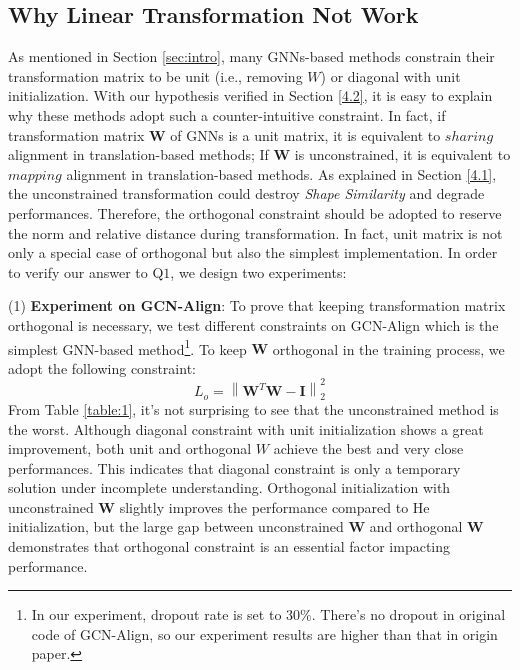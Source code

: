 \documentclass[sigconf,camera-ready]{acmart}
\begin{document}
\subsection{Why Linear Transformation Not Work}
\label{4.3}
As mentioned in Section \ref{sec:intro}, many GNNs-based methods \cite{DBLP:conf/acl/CaoLLLLC19,yang2019aligning,li-etal-2019-semi,DBLP:conf/wsdm/MaoWXLW20} constrain their transformation matrix to be unit (i.e., removing $W$) or diagonal with unit initialization.
With our hypothesis verified in Section \ref{4.2}, it is easy to explain why these methods adopt such a counter-intuitive constraint.
In fact, if transformation matrix $\bm{W}$ of GNNs is a unit matrix, it is equivalent to $sharing$ alignment in translation-based methods;
If $\bm{W}$ is unconstrained, it is equivalent to $mapping$ alignment in translation-based methods.
As explained in Section \ref{4.1}, the unconstrained transformation could destroy \emph{Shape Similarity} and degrade performances.
Therefore, the orthogonal constraint should be adopted to reserve the norm and relative distance during transformation.
In fact, unit matrix is not only a special case of orthogonal but also the simplest implementation.
In order to verify our answer to Q$1$, we design two experiments:

\noindent
(1) \textbf{Experiment on GCN-Align}:
To prove that keeping transformation matrix orthogonal is necessary,
we test different constraints on GCN-Align which is the simplest GNN-based method\footnote{In our experiment, dropout  rate is set to $30\%$. There's no dropout in original code of GCN-Align, so our experiment results are higher than that in origin paper.}.
To keep $\bm{W}$ orthogonal in the training process, we adopt the following constraint:
\begin{equation}
L_o=\left\|\bm{W}^{T}\bm{W}-\bm{I}\right\|^2_2
\end{equation}
From Table \ref{table:1},
it's not surprising to see that the unconstrained method is the worst.
Although diagonal constraint with unit initialization shows a great improvement, both unit and orthogonal $W$ achieve the best and very close performances.
This indicates that diagonal constraint is only a temporary solution under incomplete understanding.
Orthogonal initialization with unconstrained $\bm{W}$ slightly improves the performance compared to He initialization,
but the large gap between unconstrained $\bm{W}$ and orthogonal $\bm{W}$ demonstrates that orthogonal constraint is an essential factor impacting performance.
\end{document}
